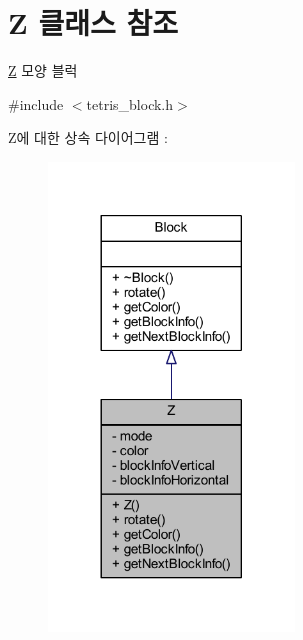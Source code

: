 \hypertarget{class_z}{}\section{Z 클래스 참조}
\label{class_z}


\mbox{\hyperlink{class_z}{Z}} 모양 블럭  




{\ttfamily \#include $<$tetris\+\_\+block.\+h$>$}



Z에 대한 상속 다이어그램 \+: 
\nopagebreak
\begin{figure}[H]
\begin{center}
\leavevmode
\includegraphics[width=185pt]{class_z__inherit__graph}
\end{center}
\end{figure}


